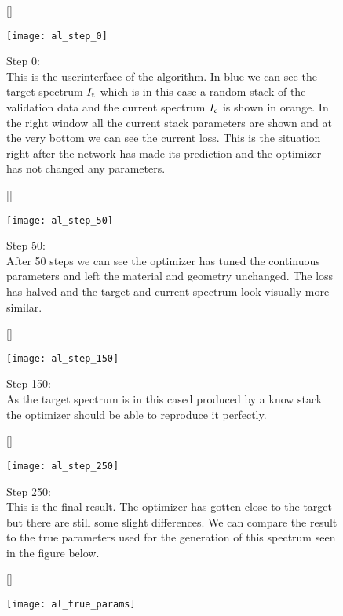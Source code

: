 \begin{figure}[H]
    [\FBwidth]
    {\caption*{
    Step 0: \\
    This is the userinterface of the algorithm. In blue we can see the target spectrum $I_{\mathrm{t}}$ which is in this case a random stack of the validation data and the current spectrum $I_{\mathrm{c}}$ is shown in orange. In the right window all the current stack parameters are shown and at the very bottom we can see the current loss. This is the situation right after the network has made its prediction and the optimizer has not changed any parameters.}
    \label{fig:al:same_spec}}
    {\texttt{[image: al\_step\_0]}}
\end{figure}

\begin{figure}[H]
    [\FBwidth]
    {\caption*{
    Step 50: \\
    After 50 steps we can see the optimizer has tuned the continuous parameters and left the material and geometry unchanged. The loss has halved and the target and current spectrum look visually more similar.}
    \label{fig:al:same_spec}}
    {\texttt{[image: al\_step\_50]}}
\end{figure}

\begin{figure}[H]
    [\FBwidth]
    {\caption*{
    Step 150:\\
    As the target spectrum is in this cased produced by a know stack the optimizer should be able to reproduce it perfectly.
    }
    \label{fig:al:same_spec}}
    {\texttt{[image: al\_step\_150]}}
\end{figure}

\begin{figure}[H]
    [\FBwidth]
    {\caption*{
    Step 250:\\
    This is the final result. The optimizer has gotten close to the target but there are still some slight differences. We can compare the result to the true parameters used for the generation of this spectrum seen in the figure below.
    }
    \label{fig:al:same_spec}}
    {\texttt{[image: al\_step\_250]}}
\end{figure}

\begin{figure}[H]
    [\FBwidth]
    {\caption*{
    }
    \label{fig:al:same_spec}}
    {\texttt{[image: al\_true\_params]}}
\end{figure}